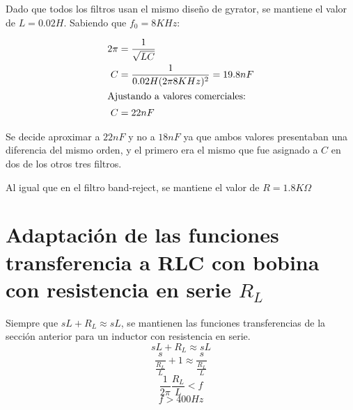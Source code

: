 Dado que todos los filtros usan el mismo dise\~no de gyrator, se mantiene el valor de $L=0.02H$. Sabiendo que $f_0=8KHz$:

\begin{align*}
2\pi &= \frac{1}{\sqrt{LC}} \\
C &= \frac{1}{0.02H (2\pi 8KHz)^2} = 19.8nF\\
\intertext{Ajustando a valores comerciales:}
C &= 22nF
\end{align*}

Se decide aproximar a $22nF$ y no a $18nF$ ya que ambos valores presentaban una diferencia del mismo orden, y el primero era el mismo que fue asignado a $C$ en dos de los otros tres filtros.

Al igual que en el filtro band-reject, se mantiene el valor de $R=1.8K\Omega$

\section{Adaptaci\'on de las funciones transferencia a RLC con bobina con resistencia en serie $R_L$}

Siempre que $sL+R_L \approx sL$, se mantienen las funciones transferencias de la secci\'on anterior para un inductor con resistencia en serie.
\[sL+R_L \approx sL\]
\[\frac{s}{\frac{R_L}{L}} + 1 \approx \frac{s}{\frac{R_L}{L}}\]
\[\frac{1}{2\pi} \frac{R_L}{L} < f\]
\[f>400Hz\]
